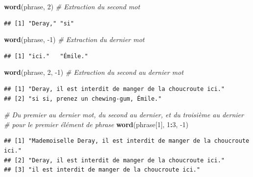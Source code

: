 \documentclass[
  11pt,
]{book}
\newenvironment{Shaded}{\begin{snugshade}}{\end{snugshade}}
\newcommand{\CommentTok}[1]{\textcolor[rgb]{0.56,0.35,0.01}{\textit{#1}}}
\newcommand{\DecValTok}[1]{\textcolor[rgb]{0.00,0.00,0.81}{#1}}
\newcommand{\KeywordTok}[1]{\textcolor[rgb]{0.13,0.29,0.53}{\textbf{#1}}}
\newcommand{\NormalTok}[1]{#1}
\newcommand{\OperatorTok}[1]{\textcolor[rgb]{0.81,0.36,0.00}{\textbf{#1}}}
\numberwithin{equation}{section}
\numberwithin{countremarque}{section}
\begin{document}
\begin{Shaded}
\begin{Highlighting}[]
\KeywordTok{word}\NormalTok{(phrase, }\DecValTok{2}\NormalTok{) }\CommentTok{\# Extraction du second mot}
\end{Highlighting}
\end{Shaded}

\begin{lstlisting}
## [1] "Deray," "si"
\end{lstlisting}

\begin{Shaded}
\begin{Highlighting}[]
\KeywordTok{word}\NormalTok{(phrase, }\DecValTok{{-}1}\NormalTok{) }\CommentTok{\# Extraction du dernier mot}
\end{Highlighting}
\end{Shaded}

\begin{lstlisting}
## [1] "ici."   "Émile."
\end{lstlisting}

\begin{Shaded}
\begin{Highlighting}[]
\KeywordTok{word}\NormalTok{(phrase, }\DecValTok{2}\NormalTok{, }\DecValTok{{-}1}\NormalTok{) }\CommentTok{\# Extraction du second au dernier mot}
\end{Highlighting}
\end{Shaded}

\begin{lstlisting}
## [1] "Deray, il est interdit de manger de la choucroute ici."
## [2] "si si, prenez un chewing-gum, Émile."
\end{lstlisting}

\begin{Shaded}
\begin{Highlighting}[]
\CommentTok{\# Du premier au dernier mot, du second au dernier, et du troisième au dernier}
\CommentTok{\# pour le premier élément de phrase}
\KeywordTok{word}\NormalTok{(phrase[}\DecValTok{1}\NormalTok{], }\DecValTok{1}\OperatorTok{:}\DecValTok{3}\NormalTok{, }\DecValTok{{-}1}\NormalTok{)}
\end{Highlighting}
\end{Shaded}

\begin{lstlisting}
## [1] "Mademoiselle Deray, il est interdit de manger de la choucroute ici."
## [2] "Deray, il est interdit de manger de la choucroute ici."             
## [3] "il est interdit de manger de la choucroute ici."
\end{lstlisting}
\end{document}
